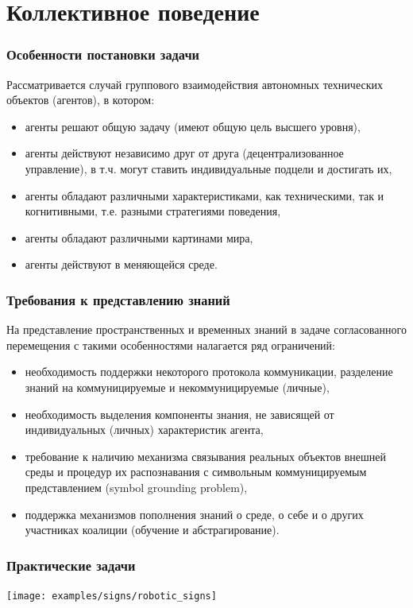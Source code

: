 \documentclass[default]{beamer}
\begin{document}
	\section{Коллективное поведение}
	
	\begin{frame}
		\frametitle{Особенности постановки задачи}
		
		Рассматривается случай группового взаимодействия автономных технических объектов (агентов), в котором:
		\begin{itemize}
			\item агенты решают общую задачу (имеют общую цель высшего уровня),
			\item агенты действуют независимо друг от друга (децентрализованное управление), в т.ч. могут ставить индивидуальные подцели и достигать их,
			\item агенты обладают различными характеристиками, как техническими, так и когнитивными, т.е. разными стратегиями поведения,
			\item агенты обладают различными картинами мира,
			\item агенты действуют в меняющейся среде.
		\end{itemize}
		
	\end{frame}
	
	\begin{frame}
		\frametitle{Требования к представлению знаний}
		
		На представление пространственных и временных знаний в задаче согласованного перемещения с такими особенностями налагается ряд ограничений:
		\begin{itemize}
			\item необходимость поддержки некоторого протокола коммуникации, разделение знаний на коммуницируемые и некоммуницируемые (личные),
			\item необходимость выделения компоненты знания, не зависящей от индивидуальных (личных) характеристик агента,
			\item требование к наличию механизма связывания реальных объектов внешней среды и процедур их распознавания с символьным коммуницируемым представлением (symbol grounding problem),
			\item поддержка механизмов пополнения знаний о среде, о себе и о других участниках коалиции (обучение и абстрагирование).
		\end{itemize}
	\end{frame}
	
	\begin{frame}
		\frametitle{Практические задачи}
		
		\centering
		\texttt{[image: examples/signs/robotic\_signs]}
	
	\end{frame}
	
\end{document}
